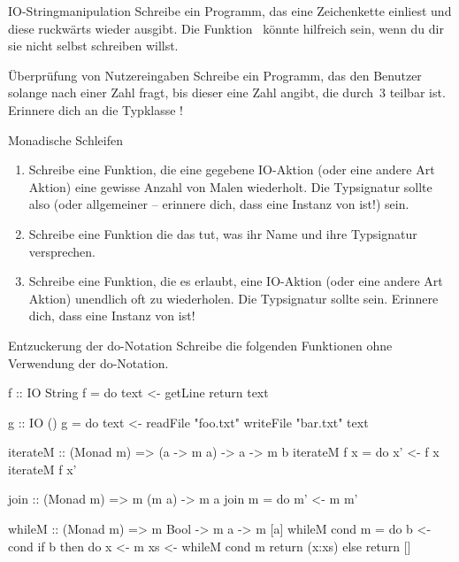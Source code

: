 \documentclass{uebblatt}
\begin{document}
\begin{aufgabe}{IO-Stringmanipulation}
Schreibe ein Programm, das eine Zeichenkette einliest und diese ruckwärts wieder ausgibt. Die Funktion~ könnte hilfreich sein, wenn du dir sie nicht selbst schreiben willst.
\end{aufgabe}

\begin{aufgabe}{Überprüfung von Nutzereingaben}
Schreibe ein Programm, das den Benutzer solange nach einer Zahl fragt, bis dieser eine Zahl angibt, die durch~3 teilbar ist. Erinnere dich an die Typklasse !
\end{aufgabe}

\begin{aufgabe}{Monadische Schleifen}
\begin{enumerate}
\item Schreibe eine Funktion, die eine gegebene IO-Aktion (oder eine andere Art Aktion) eine gewisse Anzahl von Malen wiederholt. Die Typsignatur sollte also  (oder allgemeiner  -- erinnere dich, dass  eine Instanz von  ist!) sein.
\item Schreibe eine Funktion  die das tut, was ihr Name und ihre Typsignatur versprechen.
\item Schreibe eine Funktion, die es erlaubt, eine IO-Aktion (oder eine andere Art Aktion) unendlich oft zu wiederholen. Die Typsignatur sollte  sein. Erinnere dich, dass  eine Instanz von  ist!
\end{enumerate}
\end{aufgabe}

\begin{aufgabe}{Entzuckerung der do-Notation}
Schreibe die folgenden Funktionen ohne Verwendung der do-Notation.

\begin{haskellcode}
f :: IO String
f = do
    text <- getLine
    return text

g :: IO ()
g = do
    text <- readFile "foo.txt"
    writeFile "bar.txt" text

iterateM :: (Monad m) => (a -> m a) -> a -> m b
iterateM f x = do
    x' <- f x
    iterateM f x'

join :: (Monad m) => m (m a) -> m a
join m = do
    m' <- m
    m'

whileM :: (Monad m) => m Bool -> m a -> m [a]
whileM cond m = do
    b <- cond
    if b
        then do
            x  <- m
            xs <- whileM cond m
            return (x:xs)
        else return []
\end{haskellcode}
\end{aufgabe}
\end{document}
